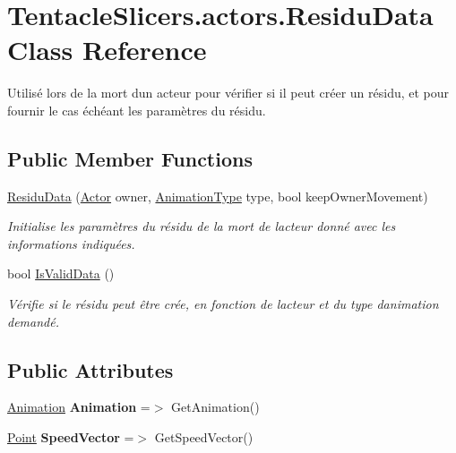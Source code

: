 \hypertarget{class_tentacle_slicers_1_1actors_1_1_residu_data}{}\section{Tentacle\+Slicers.\+actors.\+Residu\+Data Class Reference}
\label{class_tentacle_slicers_1_1actors_1_1_residu_data}


Utilisé lors de la mort d\textquotesingle{}un acteur pour vérifier si il peut créer un résidu, et pour fournir le cas échéant les paramètres du résidu.  


\subsection*{Public Member Functions}
\begin{DoxyCompactItemize}
\item 
\hyperlink{class_tentacle_slicers_1_1actors_1_1_residu_data_a9e187ab497a159aa1122a96f81f6fced}{Residu\+Data} (\hyperlink{class_tentacle_slicers_1_1actors_1_1_actor}{Actor} owner, \hyperlink{namespace_tentacle_slicers_1_1graphics_a9c92bd633d714099730f10897a01950b}{Animation\+Type} type, bool keep\+Owner\+Movement)
\begin{DoxyCompactList}\small\item\em Initialise les paramètres du résidu de la mort de l\textquotesingle{}acteur donné avec les informations indiquées. \end{DoxyCompactList}\item 
bool \hyperlink{class_tentacle_slicers_1_1actors_1_1_residu_data_a210a14ceb5de1859a2d3c225446b37ff}{Is\+Valid\+Data} ()
\begin{DoxyCompactList}\small\item\em Vérifie si le résidu peut être crée, en fonction de l\textquotesingle{}acteur et du type d\textquotesingle{}animation demandé. \end{DoxyCompactList}\end{DoxyCompactItemize}
\subsection*{Public Attributes}
\begin{DoxyCompactItemize}
\item 
\mbox{\label{class_tentacle_slicers_1_1actors_1_1_residu_data_a3bf3709c9d3fbe27f8ca997dfb0ec88a}} 
\hyperlink{class_tentacle_slicers_1_1graphics_1_1_animation}{Animation} {\bfseries Animation} =$>$ Get\+Animation()
\item 
\mbox{\label{class_tentacle_slicers_1_1actors_1_1_residu_data_a94e1fa921e154afebef25078911f6a42}} 
\hyperlink{class_tentacle_slicers_1_1general_1_1_point}{Point} {\bfseries Speed\+Vector} =$>$ Get\+Speed\+Vector()
\end{DoxyCompactItemize}


